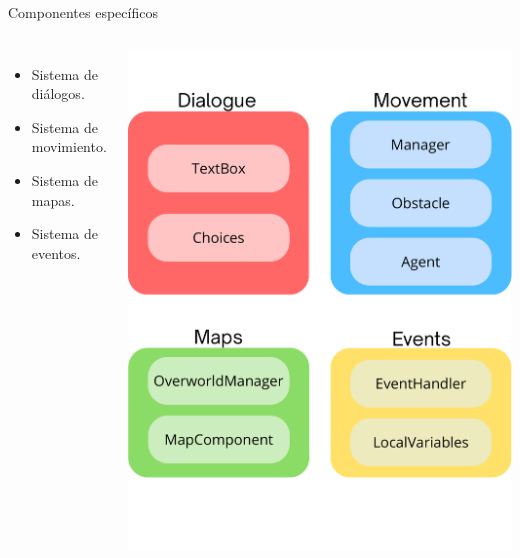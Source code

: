 \documentclass[aspectratio=169]{beamer}
\begin{document}
\begin{frame}{Componentes específicos}
	\begin{columns}
			\begin{itemize}
				\item Sistema de diálogos.
				\item Sistema de movimiento.
				\item Sistema de mapas.
				\item Sistema de eventos.
			\end{itemize}
			\includegraphics[height=0.85\textheight]{imgs/motor/ComponentesEspecificos.pdf}
	\end{columns}
\end{frame}
\end{document}
